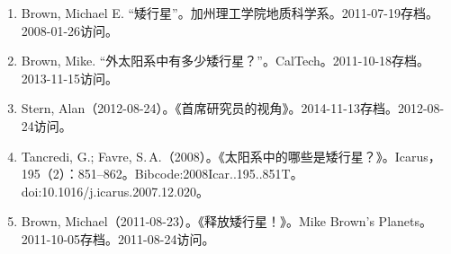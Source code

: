 \begin{enumerate}
\item Brown, Michael E. “矮行星”。加州理工学院地质科学系。2011-07-19存档。2008-01-26访问。
\item Brown, Mike. “外太阳系中有多少矮行星？”。CalTech。2011-10-18存档。2013-11-15访问。
\item Stern, Alan（2012-08-24）。《首席研究员的视角》。2014-11-13存档。2012-08-24访问。
\item Tancredi, G.; Favre, S.\,A.（2008）。《太阳系中的哪些是矮行星？》。Icarus，195（2）：851–862。Bibcode:2008Icar..195..851T。doi:10.1016/j.icarus.2007.12.020。
\item Brown, Michael（2011-08-23）。《释放矮行星！》。Mike Brown's Planets。2011-10-05存档。2011-08-24访问。



\end{enumerate}


